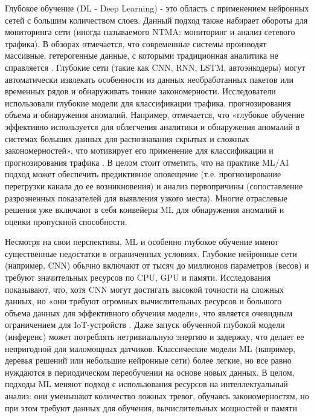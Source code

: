 Глубокое обучение (DL - Deep Learning) - это область с применением нейронных сетей с большим количеством слоев. Данный подход также набирает обороты для мониторинга сети (иногда называемого NTMA: мониторинг и анализ сетевого трафика). В обзорах отмечается, что современные системы производят массивные, гетерогенные данные, с которыми традиционная аналитика не справляется \cite{Abbasi2021}. Глубокие сети (такие как CNN, RNN, LSTM, автоэнкодеры) могут автоматически извлекать особенности из данных необработанных пакетов или временных рядов и обнаруживать тонкие закономерности. Исследователи использовали глубокие модели для классификации трафика, прогнозирования объема и обнаружения аномалий. Например, отмечается, что «глубокое обучение эффективно используется для облегчения аналитики и обнаружения аномалий в системах больших данных для распознавания скрытых и сложных закономерностей», что мотивирует его применение для классификации и прогнозирования трафика \cite{Abbasi2021}. В целом стоит отметить, что на практике ML/AI подход может обеспечить предиктивное оповещение (т.е. прогнозирование перегрузки канала до ее возникновения) и анализ первопричины (сопоставление разрозненных показателей для выявления узкого места). Многие отраслевые решения уже включают в себя конвейеры ML для обнаружения аномалий и оценки пропускной способности.


Несмотря на свои перспективы, ML и особенно глубокое обучение имеют существенные недостатки в ограниченных условиях. Глубокие нейронные сети (например, CNN) обычно включают от тысяч до миллионов параметров (весов) и требуют значительных ресурсов по CPU, GPU и памяти. Исследования показывают, что, хотя CNN могут достигать высокой точности на сложных данных, но «они требуют огромных вычислительных ресурсов и большого объема данных для эффективного обучения модели», что является очевидным ограничением для IoT-устройств \cite{Jebur2025}. Даже запуск обученной глубокой модели (инференс) может потреблять нетривиальную энергию и задержку, что делает ее непригодной для маломощных датчиков. Классические модели ML (например, деревья решений или небольшие нейронные сети) более легкие, но все равно нуждаются в периодическом переобучении на основе новых данных. В целом, подходы ML меняют подход с использования ресурсов на интеллектуальный анализ: они уменьшают количество ложных тревог, обучаясь закономерностям, но при этом требуют данных для обучения, вычислительных мощностей и памяти \cite{mon_chall}.


